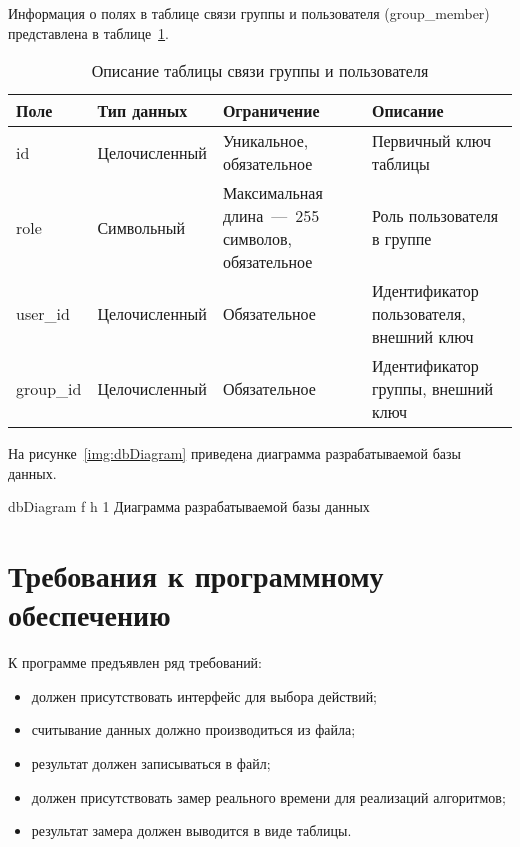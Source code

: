 Информация о полях в таблице связи группы и пользователя (group\_member) представлена в таблице~\ref{tab:groupmember}.

\begin{table}[H]
	\centering
	\caption{Описание таблицы связи группы и пользователя}
	\label{tab:groupmember}
	\begin{tabularx}{\textwidth}{|l|l|X|X|}
		\hline
		\textbf{Поле} & \textbf{Тип данных} & \textbf{Ограничение}   & \textbf{Описание} \\ \hline
		id & Целочисленный  &  Уникальное, обязательное  & Первичный ключ таблицы  \\ \hline
		role & Символьный  & Максимальная длина~---~255 символов, обязательное &  Роль пользователя в группе \\ \hline
		user\_id & Целочисленный & Обязательное& Идентификатор пользователя, внешний ключ\\ \hline
		group\_id & Целочисленный & Обязательное & Идентификатор группы, внешний ключ\\ \hline
	\end{tabularx}
\end{table}






На рисунке~\ref{img:dbDiagram} приведена диаграмма разрабатываемой базы данных.

{dbDiagram} %
{f} %
{h} %
{1\textwidth} %
{Диаграмма разрабатываемой базы данных} %





\section{Требования к программному обеспечению}

К программе предъявлен ряд требований:
\begin{itemize}
	\item должен присутствовать интерфейс для выбора действий;
	\item считывание данных должно производиться из файла;
	\item результат должен записываться в файл;
	\item должен присутствовать замер реального времени для реализаций
алгоритмов;
	\item результат замера должен выводится в виде таблицы.
\end{itemize}

